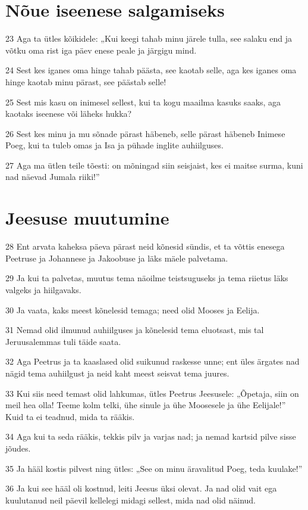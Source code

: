 \section*{Nõue iseenese salgamiseks}

\par 23 Aga ta ütles kõikidele: „Kui keegi tahab minu järele tulla, see salaku end ja võtku oma rist iga päev enese peale ja järgigu mind.
\par 24 Sest kes iganes oma hinge tahab päästa, see kaotab selle, aga kes iganes oma hinge kaotab minu pärast, see päästab selle!
\par 25 Sest mis kasu on inimesel sellest, kui ta kogu maailma kasuks saaks, aga kaotaks iseenese või läheks hukka?
\par 26 Sest kes minu ja mu sõnade pärast häbeneb, selle pärast häbeneb Inimese Poeg, kui ta tuleb omas ja Isa ja pühade inglite auhiilguses.
\par 27 Aga ma ütlen teile tõesti: on mõningad siin seisjaist, kes ei maitse surma, kuni nad näevad Jumala riiki!”

\section*{Jeesuse muutumine}

\par 28 Ent arvata kaheksa päeva pärast neid kõnesid sündis, et ta võttis enesega Peetruse ja Johannese ja Jakoobuse ja läks mäele palvetama.
\par 29 Ja kui ta palvetas, muutus tema näoilme teistsuguseks ja tema riietus läks valgeks ja hiilgavaks.
\par 30 Ja vaata, kaks meest kõnelesid temaga; need olid Mooses ja Eelija.
\par 31 Nemad olid ilmunud auhiilguses ja kõnelesid tema eluotsast, mis tal Jeruusalemmas tuli täide saata.
\par 32 Aga Peetrus ja ta kaaslased olid suikunud raskesse unne; ent üles ärgates nad nägid tema auhiilgust ja neid kaht meest seisvat tema juures.
\par 33 Kui siis need temast olid lahkumas, ütles Peetrus Jeesusele: „Õpetaja, siin on meil hea olla! Teeme kolm telki, ühe sinule ja ühe Moosesele ja ühe Eelijale!” Kuid ta ei teadnud, mida ta rääkis.
\par 34 Aga kui ta seda rääkis, tekkis pilv ja varjas nad; ja nemad kartsid pilve sisse jõudes.
\par 35 Ja hääl kostis pilvest ning ütles: „See on minu äravalitud Poeg, teda kuulake!”
\par 36 Ja kui see hääl oli kostnud, leiti Jeesus üksi olevat. Ja nad olid vait ega kuulutanud neil päevil kellelegi midagi sellest, mida nad olid näinud.

